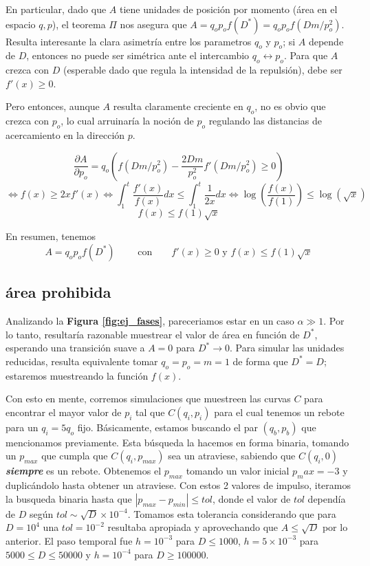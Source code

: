 \documentclass[twoside, 12pt]{article}
\providecommand{\dpart}[2]{\frac{\partial#1}{\partial#2}}
\begin{document}
En particular, dado que $A$ tiene unidades de posición por momento (área en el espacio $q,p$), el teorema $\Pi$ nos asegura que $A = q_op_o f(D^*) = q_op_o f(Dm/p_o^2)$.
Resulta interesante la clara asimetría entre los parametros $q_o$ y $p_o$; si $A$ depende de $D$, entonces no puede ser simétrica ante el intercambio $q_o \leftrightarrow p_o$.
Para que $A$ crezca con $D$ (esperable dado que regula la intensidad de la repulsión), debe ser $f'(x)\geq 0$.

Pero entonces, aunque $A$ resulta claramente creciente en $q_o$, no es obvio que crezca con $p_o$, lo cual arruinaría la noción de $p_o$ regulando las distancias de acercamiento en la dirección $p$.

\[ \dpart{A}{p_o} = q_o\left( f(Dm/p_o^2) - \frac{2Dm}{p_o^2}f'(Dm/p_o^2) \geq 0 \right) \]
\[ \Longleftrightarrow f(x) \geq 2x f'(x) \Longleftrightarrow  \int_1^t \frac{f'(x)}{f(x)}dx \leq \int_1^t\frac{1}{2x}dx \Longleftrightarrow \log{\left(\frac{f(x)}{f(1)}\right)} \leq \log{(\sqrt{x})} \]
\[ f(x) \leq f(1) \sqrt{x}\]

En resumen, tenemos
\[A = q_op_of(D^*) \qquad \text{ con} \qquad f'(x)\geq 0 \text{ y } f(x)\leq f(1)\sqrt{x} \]


\subsection{área prohibida}

Analizando la \textbf{Figura \ref{fig:ej_fases}}, pareceriamos estar en un caso $\alpha \gg 1$.
Por lo tanto, resultaría razonable muestrear el valor de área en función de $D^*$, esperando una transición suave a $A=0$ para $D^* \rightarrow 0$.
Para simular las unidades reducidas, resulta equivalente tomar $q_o = p_o = m = 1$ de forma que $D^* = D$; estaremos muestreando la función $f(x)$.

Con esto en mente, corremos simulaciones que muestreen las curvas $C$ para encontrar el mayor valor de $p_i$ tal que $C(q_i, p_i)$ para el cual tenemos un rebote para un $q_i=5q_o$ fijo.
Básicamente, estamos buscando el par $(q_b, p_b)$ que mencionamos previamente.
Esta búsqueda la hacemos en forma binaria, tomando un $p_{max}$ que cumpla que $C(q_i, p_{max})$ sea un atraviese, sabiendo que $C(q_i, 0)$ \textbf{\textit{siempre}} es un rebote.
Obtenemos el $p_{max}$ tomando un valor inicial $p_max = -3$ y duplicándolo hasta obtener un atraviese.
Con estos 2 valores de impulso, iteramos la busqueda binaria hasta que $|p_{max}-p_{min}|\leq tol$, donde el valor de $tol$ dependía de $D$ según $tol \sim \sqrt{D}\times 10^{-4}$.
Tomamos esta tolerancia considerando que para $D=10^4$ una $tol = 10^{-2}$ resultaba apropiada y aprovechando que $A\leq \sqrt{D}$ por lo anterior.
El paso temporal fue $h=10^{-3}$ para $D\leq 1000$, $h=5\times10^{-3}$ para $5000\leq D\leq 50000$ y $h=10^{-4}$ para $D\geq 100000$.
\end{document}
